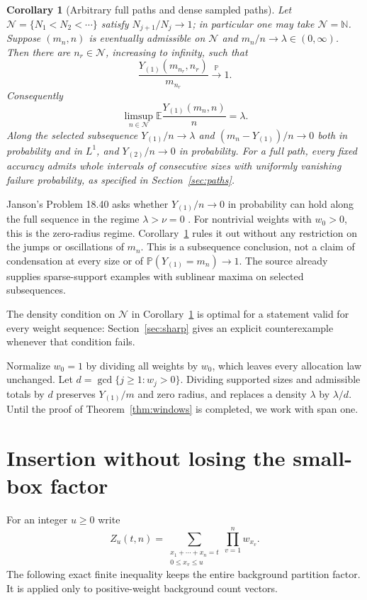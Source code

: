 \documentclass[11pt]{article}
\newtheorem{corollary}[theorem]{Corollary}
\theoremstyle{remark}\newtheorem{remark}[theorem]{Remark}
\newcommand{\Pp}{\mathbb P}
\newcommand{\E}{\mathbb E}
\newcommand{\N}{\mathbb N}
\begin{document}
\begin{corollary}[Arbitrary full paths and dense sampled paths]\label{cor:paths}
Let $\mathcal N=\{N_1<N_2<\cdots\}$ satisfy $N_{j+1}/N_j\to1$; in particular
one may take $\mathcal N=\N$. Suppose $(m_n,n)$ is eventually admissible on
$\mathcal N$ and $m_n/n\to\lambda\in(0,\infty)$. Then there are
$n_r\in\mathcal N$, increasing to infinity, such that
\begin{equation}\label{eq:conclusion}
 \frac{Y_{(1)}(m_{n_r},n_r)}{m_{n_r}}\xrightarrow{\Pp}1.
\end{equation}
Consequently
\[
 \limsup_{n\in\mathcal N}\E\frac{Y_{(1)}(m_n,n)}n=\lambda.
\]
Along the selected subsequence $Y_{(1)}/n\to\lambda$ and
$(m_n-Y_{(1)})/n\to0$ both in probability and in $L^1$, and
$Y_{(2)}/n\to0$ in probability. For a full path, every fixed accuracy admits
whole intervals of consecutive sizes with uniformly vanishing failure
probability, as specified in Section~\ref{sec:paths}.
\end{corollary}

Janson's Problem 18.40 asks whether $Y_{(1)}/n\to0$ in probability can hold
along the full sequence in the regime $\lambda>\nu=0$
\cite[Section 18.6, Problem 18.40]{Janson}. For nontrivial weights with
$w_0>0$, this is the zero-radius regime. Corollary~\ref{cor:paths} rules it
out without any restriction on the jumps or oscillations of $m_n$. This
is a subsequence conclusion, not a claim of condensation at every size or
of $\Pp(Y_{(1)}=m_n)\to1$. The source already supplies sparse-support
examples with sublinear maxima on selected subsequences.

The density condition on $\mathcal N$ in Corollary~\ref{cor:paths} is optimal
for a statement valid for every weight sequence: Section~\ref{sec:sharp}
gives an explicit counterexample whenever that condition fails.

Normalize $w_0=1$ by dividing all weights by $w_0$, which leaves every
allocation law unchanged. Let $d=\gcd\{j\ge1:w_j>0\}$. Dividing supported
sizes and admissible totals by $d$ preserves $Y_{(1)}/m$ and zero radius,
and replaces a density $\lambda$ by $\lambda/d$. Until the proof of
Theorem~\ref{thm:windows} is completed, we work with span one.

\section{Insertion without losing the small-box factor}
For an integer $u\ge0$ write
\[
 Z_u(t,n)=\sum_{\substack{x_1+\cdots+x_n=t\\0\le x_v\le u}}
             \prod_{v=1}^n w_{x_v}.
\]
The following exact finite inequality keeps the entire background partition
factor. It is applied only to positive-weight background count vectors.
\end{document}
